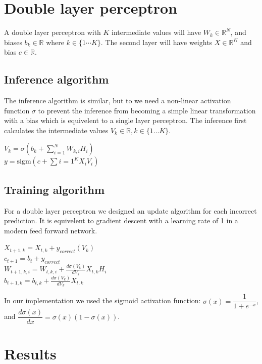 \documentclass{article}
\begin{document}
\section*{Double layer perceptron}
A double layer perceptron with $K$ intermediate values will have $W_k \in \mathbb{R}^N$, and biases $b_k \in \mathbb{R}$ where $k \in \{ 1 \cdots K\}$. The second layer will have weights $X \in \mathbb{R}^K$ and bias $c \in \mathbb{R}$.
\subsection*{Inference algorithm}
The inference algorithm is similar, but to we need a non-linear activation function $\sigma$ to prevent the inference from becoming a simple linear transformation with a bias which is equivelent to a single layer perceptron. The inference first calculates the intermediate values $V_k \in \mathbb{R}, k \in \{ 1 \dots K \}$.
\begin{center}
  $V_k = \sigma(b_k + \sum_{i = 1}^N W_{k, i}H_i)$\\
  $y = \text{sigm}(c + \sum{i = 1}^K X_iV_i)$
\end{center}
\subsection*{Training algorithm}
For a double layer perceptron we designed an update algorithm for each incorrect prediction. It is equivelent to gradient descent with a learning rate of 1 in a modern feed forward network.
\begin{center}
  $X_{t+1, k} = X_{t, k} + y_{correct}(V_k)$\\
  $c_{t+1} = b_t + y_{correct}$\\
  $W_{t+1, k, i} = W_{t, k, i} + \frac{d\sigma(V_k)}{dV_k} X_{t, k} H_i$\\
  $b_{t+1, k} = b_{t, k} + \frac{d\sigma(V_k)}{dV_k} X_{t, k}$
\end{center}
In our implementation we used the sigmoid activation function: $\sigma(x) = \dfrac{1}{1 + e^{-x}}$, and $\dfrac{d\sigma(x)}{dx} = \sigma(x) (1 - \sigma(x))$.
\section*{Results}
\end{document}
